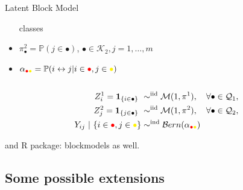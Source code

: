 \documentclass[compress,10pt]{beamer}
\newcommand{\bpi}{\mathbf{\pi}}
\begin{document}
\begin{frame}
\begin{center}
\begin{overlayarea}{\textwidth}{.5\textheight}
\begin{columns}
\begin{column}{.5\paperwidth}
\begin{small}
\begin{block}{Latent Block Model}
\begin{itemize}
                classes
               \item  $\pi^2_\bullet  =  \mathbb{P}(j  \in  \bullet)$,
                $\bullet\in\mathcal{K}_2,j=1,\dots,m$
              \item      $\alpha_{\textcolor{red}{\bullet}\textcolor{yellow}{\bullet}}     =      \mathbb{P}(i
                \leftrightarrow j | i\in\textcolor{red}{\bullet},j\in\textcolor{yellow}{\bullet})$
              \end{itemize}
            \end{block}
          \end{small}
        \end{column}
      \end{columns}
    \end{overlayarea}
  \end{center}
  

\begin{align*}
Z^1_i = \mathbf{1}_{\{i \in \bullet\}}  \ & \sim^{\text{iid}} \mathcal{M}(1,\bpi^1), \quad \forall\bullet \in \mathcal{Q}_1, \\ 
Z^2_j=\mathbf{1}_{\{j \in \bullet\}}  \ & \sim^{\text{iid}} \mathcal{M}(1,\bpi^2), \quad \forall\bullet \in \mathcal{Q}_2, \\
Y_{ij} \ | \ \{i\in\textcolor{red}{\bullet},j\in\textcolor{yellow}{\bullet}\}
& \sim^{\text{ind}} \mathcal{B}ern(\alpha_{\textcolor{red}{\bullet}\textcolor{yellow}{\bullet}})\\
\end{align*}


\textcolor{mygreen}{\cite{Govaert2008}} and 
\textcolor{mygreen}{R package: blockmodels} as well.

\end{frame}






\subsection{Some possible extensions}
\end{document}
